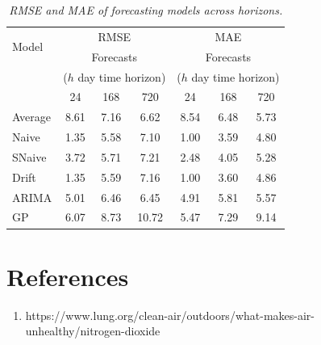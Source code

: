 \documentclass[a4paper, 10pt]{article}
\begin{document}
\begin{flushleft}
      \begin{table}[H]
         \centering
         \begin{tabular}{lcccccc}
         \hline
         \multirow{2}{*}{Model} & \multicolumn{3}{c}{RMSE} & \multicolumn{3}{c}{MAE} \\
         \cline{2-7}
         & \multicolumn{3}{c}{Forecasts} & \multicolumn{3}{c}{Forecasts} \\
         & \multicolumn{3}{c}{($h$ day time horizon)} & \multicolumn{3}{c}{($h$ day time horizon)} \\
         & 24 & 168 & 720 & 24 & 168 & 720 \\
         \hline
         Average & 8.61 & 7.16 & 6.62 & 8.54 & 6.48 & 5.73 \\
         \rowcolor{blue!20} Naive & 1.35 & 5.58 & 7.10 & 1.00 & 3.59 & 4.80 \\
         SNaive & 3.72 & 5.71 & 7.21 & 2.48 & 4.05 & 5.28 \\
         Drift & 1.35 & 5.59 & 7.16 & 1.00 & 3.60 & 4.86 \\
         ARIMA & 5.01 & 6.46 & 6.45 & 4.91 & 5.81 & 5.57 \\
         \rowcolor{red!20} GP & 6.07 & 8.73 & 10.72 & 5.47 & 7.29 & 9.14 \\
         \hline
         \end{tabular}
         \caption{\textit{RMSE and MAE of forecasting models across horizons.}}
      \end{table}

   \section*{References}
      \begin{enumerate}
         \item https://www.lung.org/clean-air/outdoors/what-makes-air-unhealthy/nitrogen-dioxide
      \end{enumerate}
   
   \end{flushleft}
\end{document}
